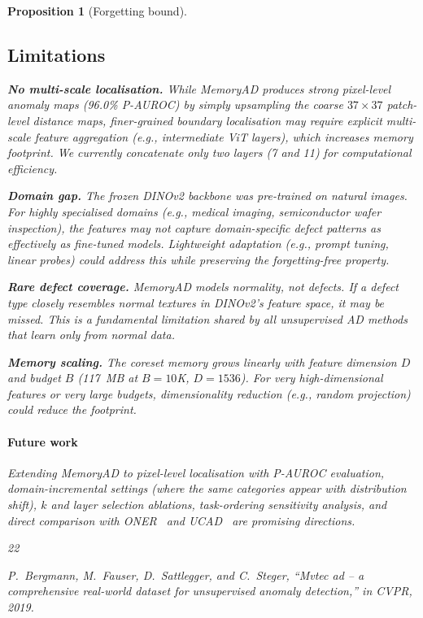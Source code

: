 \documentclass[conference]{IEEEtran}
\newcommand{\method}{MemoryAD}
\newcommand{\eg}{\textit{e.g.}}
\newtheorem{proposition}{Proposition}
\begin{document}
\begin{proposition}[Forgetting bound]
\subsection*{Limitations}

\textbf{No multi-scale localisation.} While \method{} produces strong pixel-level anomaly maps (96.0\% P-AUROC) by simply upsampling the coarse $37{\times}37$ patch-level distance maps, finer-grained boundary localisation may require explicit multi-scale feature aggregation (e.g., intermediate ViT layers), which increases memory footprint. We currently concatenate only two layers (7 and 11) for computational efficiency.

\textbf{Domain gap.} The frozen DINOv2 backbone was pre-trained on natural images. For highly specialised domains (\eg, medical imaging, semiconductor wafer inspection), the features may not capture domain-specific defect patterns as effectively as fine-tuned models. Lightweight adaptation (\eg, prompt tuning, linear probes) could address this while preserving the forgetting-free property.

\textbf{Rare defect coverage.} \method{} models normality, not defects. If a defect type closely resembles normal textures in DINOv2's feature space, it may be missed. This is a fundamental limitation shared by all unsupervised AD methods that learn only from normal data.

\textbf{Memory scaling.} The coreset memory grows linearly with feature dimension $D$ and budget $B$ (117~MB at $B{=}10$K, $D{=}1536$). For very high-dimensional features or very large budgets, dimensionality reduction (\eg, random projection) could reduce the footprint.

\paragraph{Future work} Extending \method{} to pixel-level localisation with P-AUROC evaluation, domain-incremental settings (where the same categories appear with distribution shift), $k$ and layer selection ablations, task-ordering sensitivity analysis, and direct comparison with ONER~\cite{oner2024} and UCAD~\cite{liu2024ucad} are promising directions.


\begin{thebibliography}{22}

P.~Bergmann, M.~Fauser, D.~Sattlegger, and C.~Steger, ``Mvtec ad -- a comprehensive real-world dataset for unsupervised anomaly detection,'' in \emph{CVPR}, 2019.


\end{thebibliography}
\end{proposition}
\end{document}
